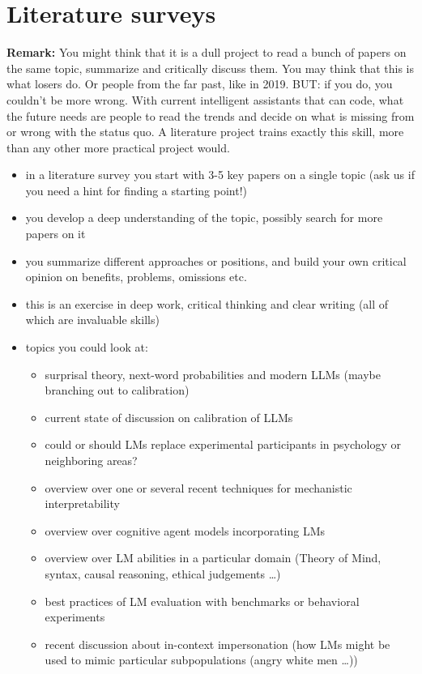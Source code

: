 \documentclass[fleqn,reqno,10pt]{article}
\begin{document}
\section{Literature surveys}

\textbf{Remark:} You might think that it is a dull project to read a bunch of papers on the same topic, summarize and critically discuss them.
You may think that this is what losers do.
Or people from the far past, like in 2019.
BUT: if you do, you couldn't be more wrong.
With current intelligent assistants that can code, what the future needs are people to read the trends and decide on what is missing from or wrong with the status quo.
A literature project trains exactly this skill, more than any other more practical project would.

\begin{itemize}
  \item in a literature survey you start with 3-5 key papers on a single topic (ask us if you need a hint for finding a starting point!)
  \item you develop a deep understanding of the topic, possibly search for more papers on it
  \item you summarize different approaches or positions, and build your own critical opinion on benefits, problems, omissions etc.
  \item this is an exercise in deep work, critical thinking and clear writing (all of which are invaluable skills)
  \item topics you could look at:
  \begin{itemize}
    \item surprisal theory, next-word probabilities and modern LLMs (maybe branching out to calibration)
    \item current state of discussion on calibration of LLMs
    \item could or should LMs replace experimental participants in psychology or neighboring areas?
    \item overview over one or several recent techniques for mechanistic interpretability
    \item overview over cognitive agent models incorporating LMs
    \item overview over LM abilities in a particular domain (Theory of Mind, syntax, causal reasoning, ethical judgements \dots)
    \item best practices of LM evaluation with benchmarks or behavioral experiments
    \item recent discussion about in-context impersonation (how LMs might be used to mimic particular subpopulations (angry white men \dots))
  \end{itemize}
\end{itemize}
\end{document}
